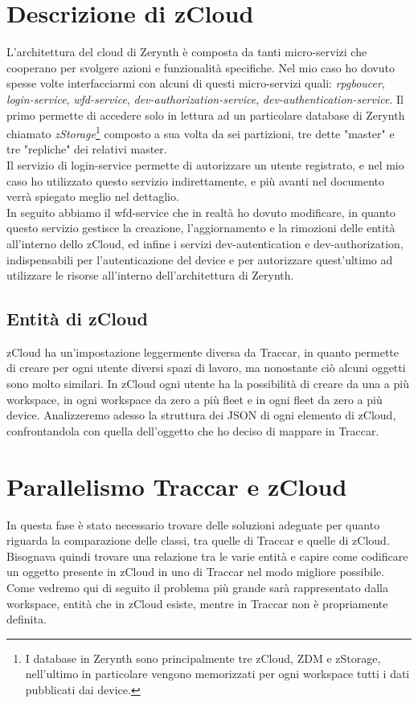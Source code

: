 \documentclass[a4paper,titlepage,12pt]{report}
\begin{document}
{\section{
Descrizione di zCloud}
L'architettura del cloud di Zerynth è composta da tanti micro-servizi che cooperano per svolgere azioni e funzionalità specifiche. Nel mio caso ho dovuto spesse volte interfacciarmi con alcuni di questi micro-servizi quali: \textit{rpgboucer}, \textit{login-service}, \textit{wfd-service}, \textit{dev-authorization-service}, \textit{dev-authentication-service}. Il primo permette di accedere solo in lettura ad un particolare database di Zerynth chiamato \textit{zStorage}\footnote{
I database in Zerynth sono principalmente tre zCloud, ZDM e zStorage, nell'ultimo in particolare vengono memorizzati per ogni workspace tutti i dati pubblicati dai device.} composto a sua volta da sei partizioni, tre dette "master" e tre "repliche" dei relativi master.\\
Il servizio di login-service permette di autorizzare un utente registrato, e nel mio caso ho utilizzato questo servizio indirettamente, e più avanti nel documento verrà spiegato meglio nel dettaglio.\\
In seguito abbiamo il wfd-service che in realtà ho dovuto modificare, in quanto questo servizio gestisce la creazione, l'aggiornamento e la rimozioni delle entità all'interno dello zCloud, ed infine i servizi dev-autentication e dev-authorization, indispensabili per l'autenticazione del device e per autorizzare quest'ultimo ad utilizzare le risorse all'interno dell'architettura di Zerynth.

\subsection{
Entità di zCloud}
zCloud ha un'impostazione leggermente diversa da Traccar, in quanto permette di creare per ogni utente diversi spazi di lavoro, ma nonostante ciò alcuni oggetti sono molto similari. In zCloud ogni utente ha la possibilità di creare da una a più workspace, in ogni workspace da zero a più fleet e in ogni fleet da zero a più device. Analizzeremo adesso la struttura dei JSON di ogni elemento di zCloud, confrontandola con quella dell'oggetto che ho deciso di mappare in Traccar.


\section{
Parallelismo Traccar e zCloud}
In questa fase è stato necessario trovare delle soluzioni adeguate per quanto riguarda la comparazione delle classi, tra quelle di Traccar e quelle di zCloud. Bisognava quindi trovare una relazione tra le varie entità e capire come codificare un oggetto presente in zCloud in uno di Traccar nel modo migliore possibile. Come vedremo qui di seguito il problema più grande sarà rappresentato dalla workspace, entità che in zCloud esiste, mentre in Traccar non è propriamente definita.



}
\end{document}
